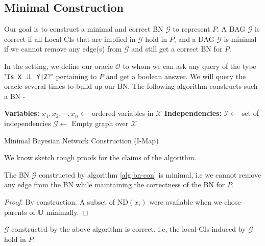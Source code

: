 \subsection{Minimal Construction}
Our goal is to construct a minimal and correct BN $\mathcal G$ to represent $P$. A DAG $\mathcal G$ is correct if all Local-CIs that are implied in $\mathcal G$ hold in $P$, and a DAG $\mathcal G$ is minimal if we cannot remove any edge(s) from $\mathcal G$ and still get a correct BN for $P$.

 In the setting, we define our oracle $\mathscr{O}$ to whom we can ask any query of the type "\texttt{Is X $\ind$ Y|Z}?" pertaining to $P$ and get a boolean answer. We will query the oracle several times to build up our BN. The following algorithm constructs such a BN - \\
\begin{algorithm}[H]\label{alg:bn-con}
	\DontPrintSemicolon
	\textbf{Variables:} $x_1, x_2, \cdots, x_n \longleftarrow$ ordered variables in $\mathcal{X}$\;
	\textbf{Independencies:} $\mathcal I \longleftarrow$ set of independencies\;
	$\mathcal G \longleftarrow$ Empty graph over $\mathcal X$\;
	\caption{Minimal Bayesian Network Construction (I-Map)}
\end{algorithm}
We know sketch rough proofs for the claims of the algorithm.
\begin{thm}
The BN $\mathcal G$ constructed by algorithm \ref{alg:bn-con} is minimal, i.e we cannot remove any edge from the BN while maintaining the correctness of the BN for $P$.
\end{thm}
\begin{proof}
By construction. A subset of $\text{ND}(x_i)$ were available when we chose parents of $\mathbf U$ minimally.
\end{proof}
\begin{thm}
$\mathcal{G}$ constructed by the above algorithm is correct, i.e, the local-CIs induced by $\mathcal G$ hold in $P$.
\end{thm}

